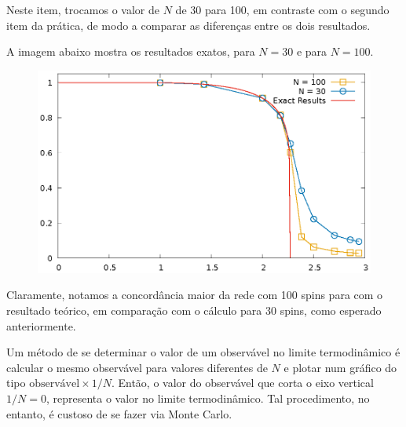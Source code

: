 



  Neste item, trocamos o valor de $N$ de 30 para 100, em contraste com o segundo item da prática, de modo a comparar as diferenças entre os dois resultados.

  A imagem abaixo mostra os resultados exatos, para $N = 30$ e para $N = 100$.

  \begin{figure}[h]
    \includegraphics{Mabs2.eps}
  \end{figure}

  Claramente, notamos a concordância maior da rede com 100 spins para com o resultado teórico, em comparação com o cálculo para 30 spins, como esperado anteriormente.

  Um método de se determinar o valor de um observável no limite termodinâmico é calcular o mesmo observável para valores diferentes de $N$ e plotar num gráfico do tipo $\text{observável} \times 1/N$. Então, o valor do observável que corta o eixo vertical $1/N = 0$, representa o valor no limite termodinâmico. Tal procedimento, no entanto, é custoso de se fazer via Monte Carlo.



